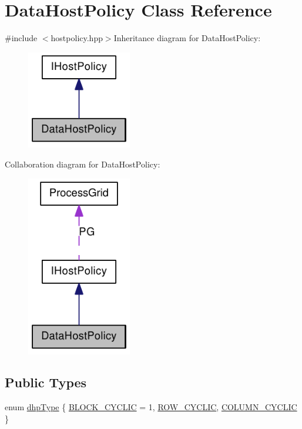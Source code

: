 \hypertarget{class_data_host_policy}{
\section{DataHostPolicy Class Reference}
\label{class_data_host_policy}
}


{\ttfamily \#include $<$hostpolicy.hpp$>$}Inheritance diagram for DataHostPolicy:\nopagebreak
\begin{figure}[H]
\begin{center}
\leavevmode
\includegraphics[width=130pt]{class_data_host_policy__inherit__graph}
\end{center}
\end{figure}
Collaboration diagram for DataHostPolicy:\nopagebreak
\begin{figure}[H]
\begin{center}
\leavevmode
\includegraphics[width=130pt]{class_data_host_policy__coll__graph}
\end{center}
\end{figure}
\subsection*{Public Types}
\begin{DoxyCompactItemize}
\item 
enum \hyperlink{class_data_host_policy_a825ddbca708ed5e3ea553ed70706b2cd}{dhpType} \{ \hyperlink{class_data_host_policy_a825ddbca708ed5e3ea553ed70706b2cda3d29e2165b635e866351997b2ef45e6b}{BLOCK\_\-CYCLIC} = 1, 
\hyperlink{class_data_host_policy_a825ddbca708ed5e3ea553ed70706b2cda3199e1a456d0437af433ba638d311d79}{ROW\_\-CYCLIC}, 
\hyperlink{class_data_host_policy_a825ddbca708ed5e3ea553ed70706b2cdaff6cee37ae123350c58516797f8f623d}{COLUMN\_\-CYCLIC}
 \}
\end{DoxyCompactItemize}
